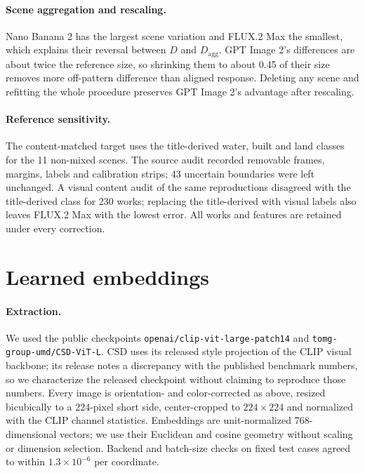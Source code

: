 \paragraph{Scene aggregation and rescaling.} Nano Banana 2 has the largest scene variation and
FLUX.2 Max the smallest, which explains their reversal between $D$ and $D_{\mathrm{agg}}$. GPT
Image 2's differences are about twice the reference size, so shrinking them to about 0.45 of
their size removes more off-pattern difference than aligned response. Deleting any scene and
refitting the whole procedure preserves GPT Image 2's advantage after rescaling.

\paragraph{Reference sensitivity.} The content-matched target uses the title-derived water,
built and land classes for the 11 non-mixed scenes. The source audit recorded removable
frames, margins, labels and calibration strips; 43 uncertain boundaries were left unchanged. A
visual content audit of the same reproductions disagreed with the title-derived class for 230
works; replacing the title-derived with visual labels also leaves FLUX.2 Max with the lowest
error. All works and features are retained under every correction.

\FloatBarrier
\section{Learned embeddings}\label{app:learned}

\paragraph{Extraction.} We used the public checkpoints \texttt{openai/clip-vit-large-patch14}
and \texttt{tomg-group-umd/CSD-ViT-L}. CSD uses its released style projection of the CLIP visual
backbone; its release notes a discrepancy with the published benchmark numbers, so we
characterize the released checkpoint without claiming to reproduce those numbers. Every image
is orientation- and color-corrected as above, resized bicubically to a 224-pixel short side,
center-cropped to $224\times224$ and normalized with the CLIP channel statistics. Embeddings
are unit-normalized 768-dimensional vectors; we use their Euclidean and cosine geometry without
scaling or dimension selection. Backend and batch-size checks on fixed test cases agreed to
within $1.3\times10^{-6}$ per coordinate.

